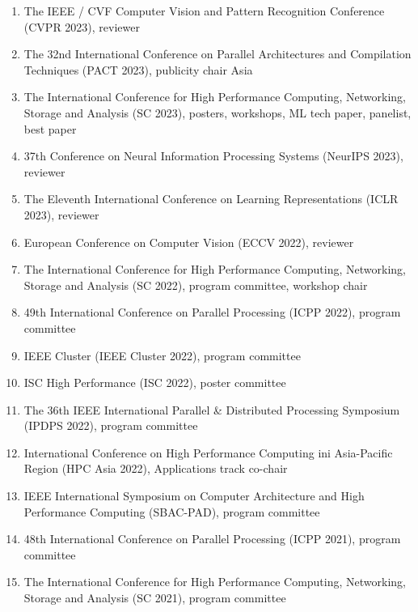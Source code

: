 \documentclass[margin,line]{cv}
\begin{document}
\begin{resume}
\begin{enumerate}
\item The IEEE / CVF Computer Vision and Pattern Recognition Conference (CVPR 2023), reviewer

\item The 32nd International Conference on Parallel Architectures and Compilation Techniques (PACT 2023), publicity chair Asia

\item The International Conference for High Performance Computing, Networking, Storage and Analysis (SC 2023), posters, workshops, ML tech paper, panelist, best paper

\item 37th Conference on Neural Information Processing Systems (NeurIPS 2023), reviewer

\item The Eleventh International Conference on Learning Representations (ICLR 2023), reviewer

\item European Conference on Computer Vision (ECCV 2022), reviewer

\item The International Conference for High Performance Computing, Networking, Storage and Analysis (SC 2022), program committee, workshop chair

\item 49th International Conference on Parallel Processing (ICPP 2022), program committee

\item IEEE Cluster (IEEE Cluster 2022), program committee

\item ISC High Performance (ISC 2022), poster committee

\item The 36th IEEE International Parallel \& Distributed Processing Symposium (IPDPS 2022), program committee

\item International Conference on High Performance Computing ini Asia-Pacific Region (HPC Asia 2022), Applications track co-chair

\item IEEE International Symposium on Computer Architecture and High Performance Computing (SBAC-PAD), program committee

\item 48th International Conference on Parallel Processing (ICPP 2021), program committee

\item The International Conference for High Performance Computing, Networking, Storage and Analysis (SC 2021), program committee


\end{enumerate}
\end{resume}
\end{document}
